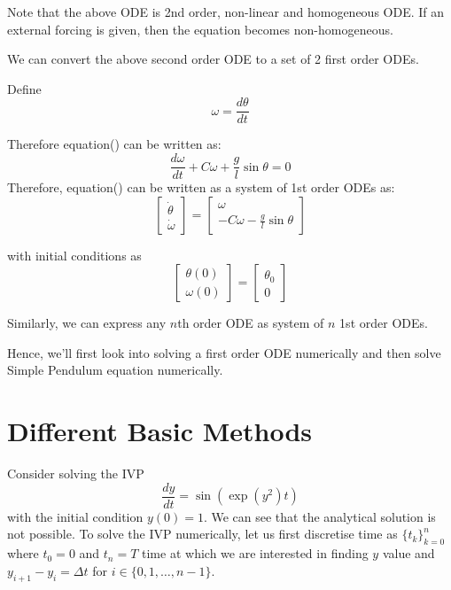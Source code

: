 \documentclass[
]{book}
\begin{document}
Note that the above ODE is 2nd order, non-linear and homogeneous ODE. If an external forcing is given, then the equation becomes non-homogeneous.

We can convert the above second order ODE to a set of 2 first order ODEs.

Define \[\omega = \frac{d\theta}{dt}\]

Therefore equation() can be written as:
\[\frac{d\omega}{dt}+C \omega+\frac{g}{l}\sin \theta = 0\]
Therefore, equation() can be written as a system of 1st order ODEs as:
\begin{equation}
\begin{bmatrix} \dot{\theta} \\  \dot{\omega} \end{bmatrix}=\begin{bmatrix} \omega \\  -C \omega-\frac{g}{l}\sin \theta \end{bmatrix}
\end{equation}

with initial conditions as
\begin{equation}
\begin{bmatrix} \theta(0) \\  \omega(0) \end{bmatrix}=\begin{bmatrix} \theta_0 \\  0 \end{bmatrix}
\end{equation}

Similarly, we can express any \(n\)th order ODE as system of \(n\) 1st order ODEs.

Hence, we'll first look into solving a first order ODE numerically and then solve Simple Pendulum equation numerically.

\hypertarget{different-basic-methods}{%
\section{Different Basic Methods}\label{different-basic-methods}}

Consider solving the IVP
\begin{equation}
\frac{dy}{dt} = \sin(\exp(y^2)t)
\end{equation}
with the initial condition \(y(0) = 1\). We can see that the analytical solution is not possible. To solve the IVP numerically, let us first discretise time as \(\{t_k\}_{k=0}^n\) where \(t_0 = 0\) and \(t_n=T\) time at which we are interested in finding \(y\) value and \(y_{i+1}-y_i = \Delta t\) for \(i\in\{0,1,\dots,n-1\}\).
\end{document}
